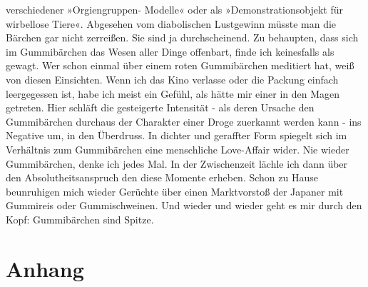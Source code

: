 \documentclass[
	english,
	ruledheaders=section,%
	class=report,%
	thesis={type=bachelor},%
	accentcolor=1b,%
	custommargins=true,%
	marginpar=false,%
	parskip=half-,%
	fontsize=11pt,%
	DIV=14,
]{tudapub}
\begin{document}
verschiedener »Orgiengruppen- Modelle« oder als »Demonstrationsobjekt für wirbellose Tiere«. Abgesehen vom diabolischen Lustgewinn müsste man die Bärchen gar nicht zerreißen. Sie sind ja durchscheinend. Zu behaupten, dass sich im Gummibärchen das Wesen aller Dinge offenbart, finde ich keinesfalls als gewagt. Wer schon einmal über einem roten Gummibärchen meditiert hat, weiß von diesen Einsichten. Wenn ich das Kino verlasse oder die Packung einfach leergegessen ist, habe ich meist ein Gefühl, als hätte mir einer in den Magen getreten. Hier schläft die gesteigerte Intensität - als deren Ursache den Gummibärchen durchaus der Charakter einer Droge zuerkannt werden kann - ins Negative um, in den Überdruss. In dichter und geraffter Form spiegelt sich im Verhältnis zum Gummibärchen eine menschliche Love-Affair wider. Nie wieder Gummibärchen, denke ich jedes Mal. In der Zwischenzeit lächle ich dann über den Absolutheitsanspruch den diese Momente erheben. Schon zu Hause beunruhigen mich wieder Gerüchte über einen Marktvorstoß der Japaner mit Gummireis oder Gummischweinen. Und wieder und wieder geht es mir durch den Kopf: Gummibärchen sind Spitze.

\chapter*{Anhang}
\setcounter{page}{\value{seitenzahlroemisch}}




\printbibliography



\end{document}
